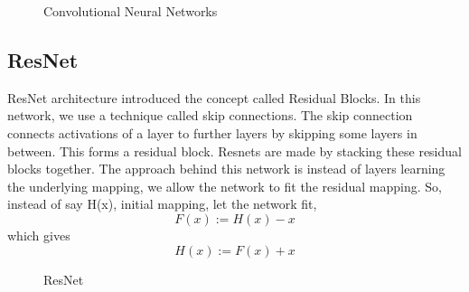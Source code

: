         \begin{figure}[hbt!]
                \caption{Convolutional Neural Networks} \cite{E1ICAW_2018_v16n3_173}
        \end{figure}

        \newpage
        \subsection{ResNet}
            ResNet\cite{DBLP:journals/corr/HeZRS15} architecture introduced the concept called Residual Blocks. In this network, we use a technique called skip connections. The skip connection connects activations of a  layer to further layers by skipping some layers in between. This forms a residual block. Resnets are made by stacking these residual blocks together. The approach behind this network is instead of layers learning the underlying mapping, we allow the network to fit the residual mapping. So, instead of say H(x), initial mapping, let the network fit,
            \begin{equation}
                F(x) := H(x) - x
            \end{equation}
            which gives
            \begin{equation}
                H(x) := F(x) + x
            \end{equation}
            \begin{figure}[hbt!]
                \caption{ResNet} \cite{enwiki:1205293224}
            \end{figure}

        
